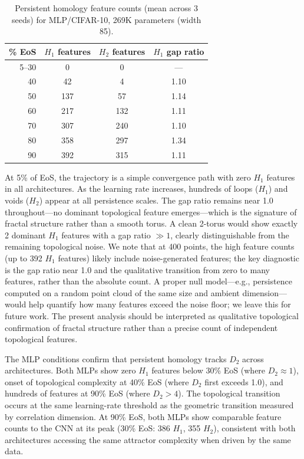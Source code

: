 \documentclass[aps,prl,twocolumn,superscriptaddress,floatfix]{revtex4-2}
\begin{document}
\begin{table}[h]
\caption{\label{tab:tda_mlp85}%
Persistent homology feature counts (mean across 3 seeds) for MLP/CIFAR-10, 269K parameters (width 85).}
\begin{ruledtabular}
\begin{tabular}{rccc}
\% EoS & $H_1$ features & $H_2$ features & $H_1$ gap ratio\\
\hline
5--30 & 0 & 0 & ---\\
40 & 42 & 4 & 1.10\\
50 & 137 & 57 & 1.14\\
60 & 217 & 132 & 1.11\\
70 & 307 & 240 & 1.10\\
80 & 358 & 297 & 1.34\\
90 & 392 & 315 & 1.11\\
\end{tabular}
\end{ruledtabular}
\end{table}

At 5\% of EoS, the trajectory is a simple convergence path with zero $H_1$ features in all architectures. As the learning rate increases, hundreds of loops ($H_1$) and voids ($H_2$) appear at all persistence scales. The gap ratio remains near 1.0 throughout---no dominant topological feature emerges---which is the signature of fractal structure rather than a smooth torus. A clean 2-torus would show exactly 2 dominant $H_1$ features with a gap ratio $\gg 1$, clearly distinguishable from the remaining topological noise. We note that at 400 points, the high feature counts (up to 392 $H_1$ features) likely include noise-generated features; the key diagnostic is the gap ratio near 1.0 and the qualitative transition from zero to many features, rather than the absolute count. A proper null model---e.g., persistence computed on a random point cloud of the same size and ambient dimension---would help quantify how many features exceed the noise floor; we leave this for future work. The present analysis should be interpreted as qualitative topological confirmation of fractal structure rather than a precise count of independent topological features.

The MLP conditions confirm that persistent homology tracks $D_2$ across architectures. Both MLPs show zero $H_1$ features below 30\% EoS (where $D_2 \approx 1$), onset of topological complexity at 40\% EoS (where $D_2$ first exceeds 1.0), and hundreds of features at 90\% EoS (where $D_2 > 4$). The topological transition occurs at the same learning-rate threshold as the geometric transition measured by correlation dimension. At 90\% EoS, both MLPs show comparable feature counts to the CNN at its peak (30\% EoS: 386 $H_1$, 355 $H_2$), consistent with both architectures accessing the same attractor complexity when driven by the same data.
\end{document}
